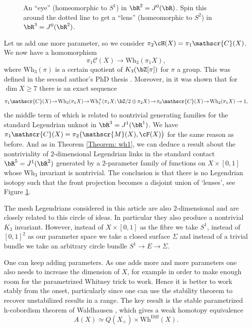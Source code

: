 \documentclass[JEP,XML,SOM,Unicode,NoFloatCountersInSection]{cedram}
\let\mathcal\mathscr
\newcommand{\Diff}{\mathrm{Diff}}
\newcommand{\Wh}{\mathrm{Wh}}
\theoremstyle{plain}
\theoremstyle{definition}
\newcommand{\cC}{\mathcal{C}}\newcommand{\cD}{\mathcal{D}}
\newcommand{\cM}{\mathcal{M}}\newcommand{\cN}{\mathcal{N}}
\begin{document}
\begin{figure}[htbp]
\begin{center}
\caption{\smaller An ``eye'' (homeomorphic to $S^1$) in $\bR^2=J^0(\bR)$. Spin this around the dotted line to get a ``lens'' (homeomorphic to $S^2$) in $\bR^3=J^0(\bR^2)$. }
\label{Fig: eye}
\end{center}
\end{figure}
%

Let us add one more parameter, so we consider $\pi_2 \cH(X) = \pi_1 \cC(X)$. We now have a homomorphism
\[ \pi_1\cC(X) \to \Wh_3( \pi_1X ), \]
where $\Wh_3(\pi)$ is a certain quotient of $K_3(\bZ[\pi])$ for $\pi$ a group. This was defined in the second author's PhD thesis \cite{I79}. Moreover, in \cite{I82} it was shown that for $\dim X \geq 7$ there is an exact sequence
\[ \pi_1 \cC(X) \!\to\! \Wh_3(\pi_1 X) \!\to\! \Wh^+_1(\pi_1X ; \bZ/2 \oplus \pi_2 X) \!\to\! \pi_0 \cC(X) \!\to\! \Wh_2(\pi_1 X) \rightarrow 1, \]
the middle term of which is related to nontrivial generating families for the standard Legendrian unknot in $\bR^3=J^1(\bR^1)$. We have $ \pi_1\cC(X) = \pi_2\big( \cM(X), \cF(X) \big)$ for the same reason as before. And as in Theorem \ref{Theorem: wh1}, we can deduce a result about the nontriviality of $2$-dimensional Legendrian links in the standard contact $\bR^5=J^1(\bR^2)$ generated by a $2$-parameter family of functions on $X \times [0,1]$ whose $\Wh_3$ invariant is nontrivial. The conclusion is that there is no Legendrian isotopy such that the front projection becomes a disjoint union of `lenses', see Figure \ref{Fig: eye}.

The mesh Legendrians considered in this article are also $2$-dimensional and are closely related to this circle of ideas. In particular they also produce a nontrivial $K_3$ invariant. However, instead of $X \times [0,1]$ as the fibre we take $S^1$, instead of $[0,1]^2$ as our parameter space we take a closed surface $\Sigma$ and instead of a trivial bundle we take an arbitrary circle bundle $S^1 \to E \to \Sigma$.

One can keep adding parameters. As one adds more and more parameters one also needs to increase the dimension of $X$, for example in order to make enough room for the parametrized Whitney trick to work. Hence it is better to work stably from the onset, particularly since one can use the stability theorem \cite{I88} to recover unstabilized results in a range. The key result is the stable parametrized h-cobordism theorem of Waldhausen \cite{W82}, which gives a weak homotopy equivalence
\[ A(X) \simeq Q(X_+) \times \Wh^{\Diff}(X). \]
\end{document}
